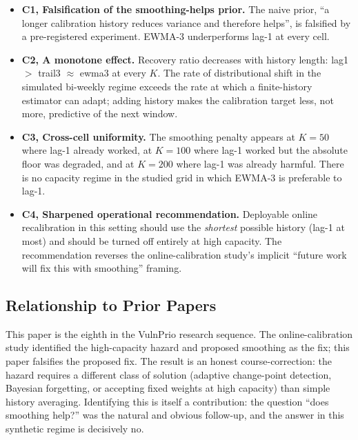 \begin{itemize}
\item \textbf{C1, Falsification of the smoothing-helps prior.} The
naive prior, ``a longer calibration history reduces variance and
therefore helps'', is falsified by a pre-registered experiment.
EWMA-3 underperforms lag-1 at every cell.

\item \textbf{C2, A monotone effect.} Recovery ratio decreases
with history length: \textsf{lag1} $>$ \textsf{trail3} $\approx$
\textsf{ewma3} at every $K$. The rate of distributional shift in
the simulated bi-weekly regime exceeds the rate at which a
finite-history estimator can adapt; adding history makes the
calibration target less, not more, predictive of the next window.

\item \textbf{C3, Cross-cell uniformity.} The smoothing penalty
appears at $K = 50$ where lag-1 already worked, at $K = 100$ where
lag-1 worked but the absolute floor was degraded, and at $K = 200$
where lag-1 was already harmful. There is no capacity regime in
the studied grid in which EWMA-3 is preferable to lag-1.

\item \textbf{C4, Sharpened operational recommendation.} Deployable
online recalibration in this setting should use the \textit{shortest}
possible history (lag-1 at most) and should be turned off entirely
at high capacity. The recommendation reverses the online-calibration study's implicit
``future work will fix this with smoothing'' framing.
\end{itemize}

\subsection{Relationship to Prior Papers}

This paper is the eighth in the VulnPrio research sequence. The online-calibration study
identified the high-capacity hazard and proposed smoothing as the
fix; this paper falsifies the proposed fix. The result is an
honest course-correction: the hazard requires a different class of
solution (adaptive change-point detection, Bayesian forgetting,
or accepting fixed weights at high capacity) than simple history
averaging. Identifying this is itself a contribution: the question
``does smoothing help?'' was the natural and obvious follow-up,
and the answer in this synthetic regime is decisively no.
